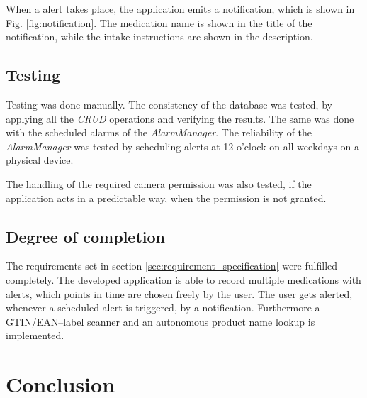 \documentclass[conference]{IEEEtran}
\begin{document}
When a alert takes place, the application emits a notification, which is shown in Fig. \ref{fig:notification}.
The medication name is shown in the title of the notification, while the intake instructions are shown in the 
description.

\subsection{Testing}
Testing was done manually. The consistency of the database was tested, by applying all the \textit{CRUD} operations
and verifying the results. The same was done with the scheduled alarms of the \textit{AlarmManager}. The reliability
of the \textit{AlarmManager} was tested by scheduling alerts at 12 o'clock on all weekdays on a physical device.

The handling of the required camera permission was also tested, if the application acts in a predictable way, when
the permission is not granted.

\subsection{Degree of completion}
The requirements set in section \ref{sec:requirement_specification} were fulfilled completely. The developed 
application is able to record multiple medications with alerts, which points in time are chosen freely by the user.
The user gets alerted, whenever a scheduled alert is triggered, by a notification. Furthermore a GTIN/EAN--label
scanner and an autonomous product name lookup is implemented.

\section{Conclusion}
\lipsum[15] %
\end{document}
